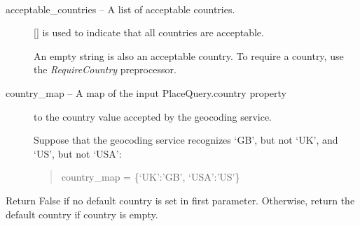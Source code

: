 \documentclass[letterpaper,10pt,english]{sphinxmanual}
\begin{document}
\begin{fulllineitems}
\label{index:omgeo.processors.preprocessors.CountryPreProcessor}~\begin{description}
\item[{acceptable\_countries -- A list of acceptable countries.}] \leavevmode
{[}{]} is used to indicate that all countries are acceptable.

An empty string is also an acceptable country. To require
a country, use the \emph{RequireCountry} preprocessor.

\item[{country\_map          -- A map of the input PlaceQuery.country property}] \leavevmode
to the country value accepted by the geocoding service.

Suppose that the geocoding service recognizes `GB', but not `UK',
and `US', but not `USA':
\begin{quote}

country\_map = \{`UK':'GB', `USA':'US'\}
\end{quote}

\end{description}

\end{fulllineitems}


\begin{fulllineitems}
\label{index:omgeo.processors.preprocessors.RequireCountry}
Return False if no default country is set in first parameter.
Otherwise, return the default country if country is empty.

\end{fulllineitems}

\label{index:module-omgeo.processors.postprocessors}
\end{document}
